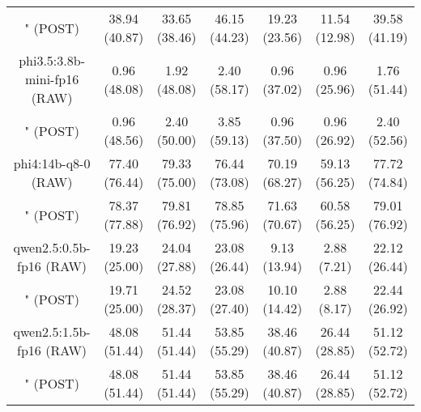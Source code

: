 \begin{table}[]
{\begin{tabular}{ccccccc}
        

        \multicolumn{1}{c|}{" (POST)} & 38.94 (40.87) & 33.65 (38.46) & \multicolumn{1}{c|}{46.15 (44.23)} & 19.23 (23.56) & \multicolumn{1}{c|}{11.54 (12.98)} & 39.58 (41.19) \\
        \cline{1-7}
        

        \multicolumn{1}{c|}{phi3.5:3.8b-mini-fp16 (RAW)} & 0.96 (48.08) & 1.92 (48.08) & \multicolumn{1}{c|}{2.40 (58.17)} & 0.96 (37.02) & \multicolumn{1}{c|}{0.96 (25.96)} & 1.76 (51.44) \\
        
        

        \multicolumn{1}{c|}{" (POST)} & 0.96 (48.56) & 2.40 (50.00) & \multicolumn{1}{c|}{3.85 (59.13)} & 0.96 (37.50) & \multicolumn{1}{c|}{0.96 (26.92)} & 2.40 (52.56) \\
        \cline{1-7}
        

        \multicolumn{1}{c|}{phi4:14b-q8-0 (RAW)} & 77.40 (76.44) & 79.33 (75.00) & \multicolumn{1}{c|}{76.44 (73.08)} & 70.19 (68.27) & \multicolumn{1}{c|}{59.13 (56.25)} & 77.72 (74.84) \\
        
        

        \multicolumn{1}{c|}{" (POST)} & 78.37 (77.88) & 79.81 (76.92) & \multicolumn{1}{c|}{78.85 (75.96)} & 71.63 (70.67) & \multicolumn{1}{c|}{60.58 (56.25)} & 79.01 (76.92) \\
        \cline{1-7}
        

        \multicolumn{1}{c|}{qwen2.5:0.5b-fp16 (RAW)} & 19.23 (25.00) & 24.04 (27.88) & \multicolumn{1}{c|}{23.08 (26.44)} & 9.13 (13.94) & \multicolumn{1}{c|}{2.88 (7.21)} & 22.12 (26.44) \\
        
        

        \multicolumn{1}{c|}{" (POST)} & 19.71 (25.00) & 24.52 (28.37) & \multicolumn{1}{c|}{23.08 (27.40)} & 10.10 (14.42) & \multicolumn{1}{c|}{2.88 (8.17)} & 22.44 (26.92) \\
        \cline{1-7}
        

        \multicolumn{1}{c|}{qwen2.5:1.5b-fp16 (RAW)} & 48.08 (51.44) & 51.44 (51.44) & \multicolumn{1}{c|}{53.85 (55.29)} & 38.46 (40.87) & \multicolumn{1}{c|}{26.44 (28.85)} & 51.12 (52.72) \\
        
        

        \multicolumn{1}{c|}{" (POST)} & 48.08 (51.44) & 51.44 (51.44) & \multicolumn{1}{c|}{53.85 (55.29)} & 38.46 (40.87) & \multicolumn{1}{c|}{26.44 (28.85)} & 51.12 (52.72) \\
        \cline{1-7}
        


\end{tabular}}
\end{table}
